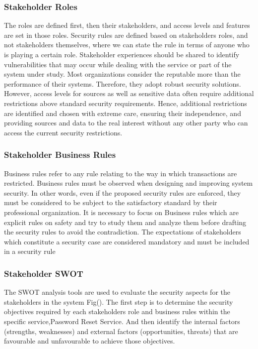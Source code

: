 \subsubsection{Stakeholder Roles}\label{strol}
The roles are defined first, then their stakeholders, and access levels and features are set in those roles. Security rules are defined based on stakeholders roles, and not stakeholders themselves, where we can state the rule in terms of anyone who is playing a certain role. Stakeholder experiences should be shared to identify vulnerabilities that may occur while dealing with the service or part of the system under study. Most organizations consider the reputable more than the performance of their systems. Therefore, they adopt robust security solutions. However, access levels for sources as well as sensitive data often require additional restrictions above standard security requirements. Hence,  additional restrictions are identified and chosen with extreme care, ensuring their independence, and providing sources and data to the real interest without any other party who can access the current security restrictions.
\subsubsection{Stakeholder Business Rules}\label{stbsnrul}
Business rules refer to any rule relating to the way in which transactions are restricted. Business rules must be observed when designing and improving system security. In other words, even if the proposed security rules are enforced, they must be considered to be subject to the satisfactory standard by their professional organization. It is necessary to focus on Business rules  which are explicit rules on safety and try to study them and analyze them before drafting the security rules to avoid the contradiction.
The expectations of stakeholders which constitute a security case are considered mandatory and must be included in a security rule

\subsubsection{Stakeholder SWOT}\label{stswot}
The SWOT analysis tools are used to evaluate the security aspects for the stakeholders in the system Fig(). The first step is to determine the security objectives required by each stakeholders role and business rules within the specific service,Password Reset Service. And then identify the internal factors (strengths, weaknesses) and external factors (opportunities, threats) that are favourable and unfavourable to achieve those objectives.

